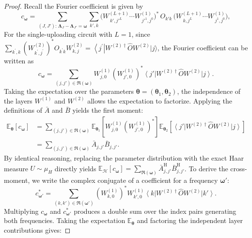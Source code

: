 \documentclass[%
 reprint,
 amsmath,amssymb,
 aps,
 pra,
]{revtex4-2}
\theoremstyle{definition}
\begin{document}
\begin{proof}
Recall the Fourier coefficient is given by
\[
c_{\boldsymbol\omega}
=\sum_{(J,J'):\,\boldsymbol\Lambda_J-\boldsymbol\Lambda_{J'}=\boldsymbol\omega}
\sum_{k',k}
\bigl(W^{(L+1)}_{\,k',j'^L}\cdots W^{(1)}_{\,j'^1,j^0}\bigr)^*
\,O_{k'k}\,
\bigl(W^{(L+1)}_{\,k,j^L}\cdots W^{(1)}_{\,j^1,j^0}\bigr),
\]
For the single-uploading circuit with $L=1$, since $\sum_{k^{\prime}, k}\left(W_{k^{\prime}, j^{\prime}}^{(2)}\right)^* O_{k^{\prime} k} W_{k, j}^{(2)}=\left\langle j^{\prime}\right| W^{(2) \dagger} \hat{O} W^{(2)}|j\rangle$, the Fourier coefficient can be written as
\begin{equation}
\label{eq:single_uploading_coefficient}
c_{\bm{\omega}}
=
\sum_{(j,j')\in\mathfrak{R}(\bm{\omega})}
W^{(1)}_{j,0}
\left(W^{(1)}_{j',0}\right)^*
\left\langle j'\right|
W^{(2)\dagger}\hat O W^{(2)}
\left|j\right\rangle .
\end{equation}
Taking the expectation over the parameters $\bm{\theta} = (\bm{\theta}_1, \bm{\theta}_2)$, the independence of the layers $W^{(1)}$ and $W^{(2)}$ allows the expectation to factorize. Applying the definitions of $\bar A$ and $\bar B$ yields the first moment:
\begin{align}
\mathbb{E}_{\bm{\theta}} \left[ c_{\bm{\omega}} \right]
&=
\sum_{(j,j')\in\mathfrak{R}(\bm{\omega})}
\mathbb{E}_{\bm{\theta}_1} \left[ W^{(1)}_{j,0} \left(W^{(1)}_{j',0}\right)^* \right]
\mathbb{E}_{\bm{\theta}_2} \left[ \left\langle j'\right| W^{(2)\dagger}\hat O W^{(2)} \left|j\right\rangle \right] \nonumber \\
&=
\sum_{(j,j')\in\mathfrak R(\bm{\omega})} \bar A_{j,j'} \bar B_{j,j'}.
\end{align}
By identical reasoning, replacing the parameter distribution with the exact Haar measure $U \sim \mu_H$ directly yields $\mathbb{E}_{\mathcal{H}} [ c_{\bm{\omega}} ] = \sum_{\mathfrak R(\bm{\omega})} \bar A^{\mathrm{H}}_{j,j'} \bar B^{\mathrm{H}}_{j,j'}$. To derive the cross-moment, we write the complex conjugate of a coefficient for a frequency $\bm{\omega}'$:
\begin{equation}
c_{\bm{\omega}'}^*
=
\sum_{(k,k')\in\mathfrak{R}(\bm{\omega}')}
\left(W^{(1)}_{k,0}\right)^*
W^{(1)}_{k',0}
\left\langle k\right| W^{(2)\dagger}\hat O W^{(2)} \left|k'\right\rangle.
\end{equation}
Multiplying $c_{\bm{\omega}}$ and $c_{\bm{\omega}'}^*$ produces a double sum over the index pairs generating both frequencies. Taking the expectation $\mathbb{E}_{\bm{\theta}}$ and factoring the independent layer contributions gives:

\end{proof}
\end{document}

